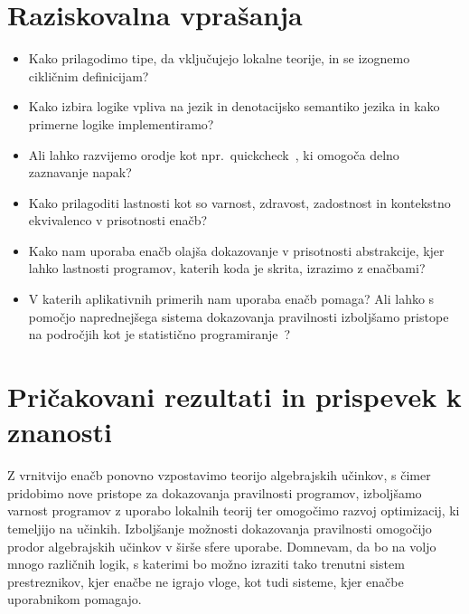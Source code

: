 \documentclass{article}
\begin{document}
\section*{Raziskovalna vprašanja}

\begin{itemize}
  \item Kako prilagodimo tipe, da vključujejo lokalne teorije, in se izognemo cikličnim definicijam?
  \item Kako izbira logike vpliva na jezik in denotacijsko semantiko jezika in kako primerne logike implementiramo?
  \item Ali lahko razvijemo orodje kot npr.\ quickcheck~\cite{DBLP:conf/icfp/ClaessenH00}, ki omogoča delno zaznavanje napak?
  \item Kako prilagoditi lastnosti kot so varnost, zdravost, zadostnost in kontekstno ekvivalenco v prisotnosti enačb?
  \item Kako nam uporaba enačb olajša dokazovanje v prisotnosti abstrakcije, kjer lahko lastnosti programov, katerih koda je skrita, izrazimo z enačbami?
  \item V katerih aplikativnih primerih nam uporaba enačb pomaga? Ali lahko s pomočjo naprednejšega sistema dokazovanja pravilnosti izboljšamo pristope na področjih kot je statistično programiranje~\cite{DBLP:journals/pacmpl/VakarKS19}?
\end{itemize}


\section*{Pričakovani rezultati in prispevek k znanosti}

Z vrnitvijo enačb ponovno vzpostavimo teorijo algebrajskih učinkov, s čimer pridobimo nove pristope za dokazovanja pravilnosti programov, izboljšamo varnost programov z uporabo lokalnih teorij ter omogočimo razvoj optimizacij, ki temeljijo na učinkih. Izboljšanje možnosti dokazovanja pravilnosti omogočijo prodor algebrajskih učinkov v širše sfere uporabe. Domnevam, da bo na voljo mnogo različnih logik, s katerimi bo možno izraziti tako trenutni sistem prestreznikov, kjer enačbe ne igrajo vloge, kot tudi sisteme, kjer enačbe uporabnikom pomagajo.


\renewcommand\refname{Literatura}


\end{document}
